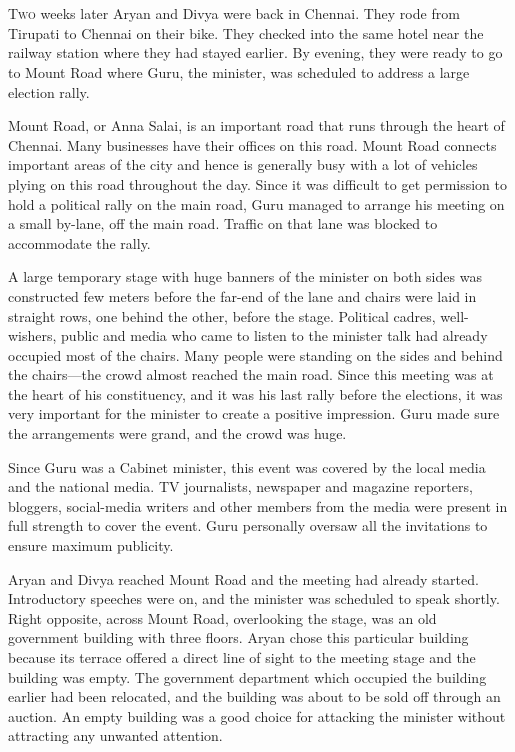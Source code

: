 \chapter{}

\lettrine{T}{wo} weeks later Aryan and Divya were back in Chennai. They rode from Tirupati to
Chennai on their bike. They checked into the same hotel near the railway station
where they had stayed earlier. By evening, they were ready to go to Mount Road
where Guru, the minister, was scheduled to address a large election rally.

Mount Road, or Anna Salai, is an important road that runs through the heart of
Chennai. Many businesses have their offices on this road. Mount Road connects
important areas of the city and hence is generally busy with a lot of vehicles
plying on this road throughout the day. Since it was difficult to get permission
to hold a political rally on the main road, Guru managed to arrange his meeting
on a small by-lane, off the main road. Traffic on that lane was blocked to
accommodate the rally.

A large temporary stage with huge banners of the minister on both sides was
constructed few meters before the far-end of the lane and chairs were laid in
straight rows, one behind the other, before the stage. Political cadres,
well-wishers, public and media who came to listen to the minister talk had
already
occupied most of the chairs. Many people were standing on the sides and behind
the chairs—the crowd almost reached the main road. Since this meeting was at
the heart of his constituency, and it was his last rally before the elections,
it was very important for the minister to create a positive impression. Guru
made sure the arrangements were grand, and the crowd was huge.

Since Guru was a Cabinet minister, this event was covered by the local media and
the national media. TV journalists, newspaper and magazine reporters, bloggers,
social-media writers and other members from the media were present in full
strength to cover the event. Guru personally oversaw all the invitations to
ensure maximum publicity.

Aryan and Divya reached Mount Road and the meeting had already started.
Introductory speeches were on, and the minister was scheduled to speak shortly.
Right opposite, across Mount Road, overlooking the stage, was an old government
building with three floors. Aryan chose this particular building because its
terrace offered a direct line of sight to the meeting stage and the building was
empty. The government department which occupied the building earlier had been
relocated, and the building was about to be sold off through an auction. An empty
building was a good choice for attacking the minister without attracting any
unwanted attention.

